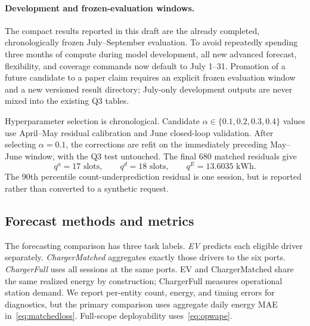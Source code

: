 \documentclass[11pt]{article}
\begin{document}
\paragraph{Development and frozen-evaluation windows.}
The compact results reported in this draft are the already completed,
chronologically frozen July--September evaluation.  To avoid repeatedly
spending three months of compute during model development, all new advanced
forecast, flexibility, and coverage commands now default to July 1--31.
Promotion of a future candidate to a paper claim requires an explicit frozen
evaluation window and a new versioned result directory; July-only development
outputs are never mixed into the existing Q3 tables.

Hyperparameter selection is chronological.  Candidate
\(\alpha\in\{0.1,0.2,0.3,0.4\}\) values use April--May residual calibration and
June closed-loop validation.  After selecting \(\alpha=0.1\), the corrections
are refit on the immediately preceding May--June window, with the Q3 test
untouched.  The final 680 matched residuals give
\[
 q^a=17\text{ slots},\qquad q^d=18\text{ slots},\qquad
 q^E=13.6035\text{ kWh}.
\]
The 90th percentile count-underprediction residual is one session, but is
reported rather than converted to a synthetic request.

\subsection{Forecast methods and metrics}

The forecasting comparison has three task labels.  \emph{EV} predicts each
eligible driver separately.  \emph{ChargerMatched} aggregates exactly those
drivers to the six ports.  \emph{ChargerFull} uses all sessions at the same
ports.  EV and ChargerMatched share the same realized energy by construction;
ChargerFull measures operational station demand.  We report per-entity
count, energy, and timing errors for diagnostics, but the primary comparison
uses aggregate daily energy MAE in~\eqref{eq:matchedloss}.  Full-scope
deployability uses~\eqref{eq:opwape}.

\begin{table}[t]
\centering
\caption{Concrete flexibility-task definitions.  Individual EV and matched
charger use the same 2,642.38 kWh of physically screened Q3 sessions, making
entity resolution the only task-level difference.  Full charger is the
separate operational estimand.}
\label{tab:flexscope}
\resizebox{\linewidth}{!}{}
\end{table}
\end{document}
